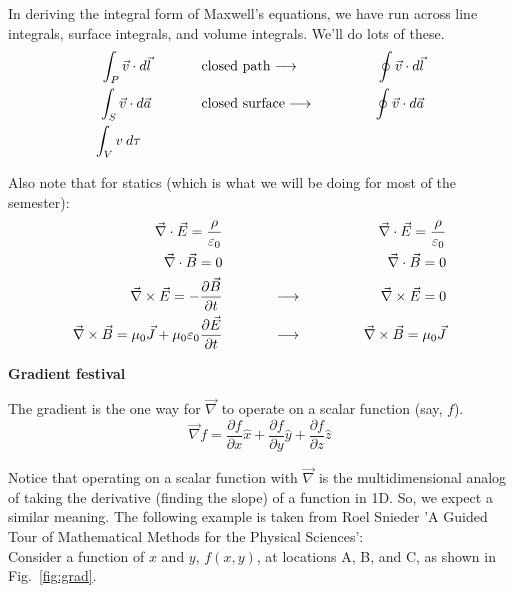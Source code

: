 \documentclass[12pt]{article}
\begin{document}
\begin{flushleft}
In deriving the integral form of Maxwell's equations, we have run across line integrals, surface integrals, and volume integrals.  We'll do lots of these.
\begin{eqnarray*}
\int_{P} \vec{v} \cdot d\vec{l}   \hspace{.5in} & \mbox{closed path} \longrightarrow  & \hspace{.5in} \oint \vec{v} \cdot d\vec{l} \\ 
\int_{S} \vec{v} \cdot d\vec{a}  \hspace{.5in} & \mbox{closed surface} \longrightarrow  & \hspace{.5in} \oint \vec{v} \cdot d\vec{a} \\
\int_{V} v \: d\tau  \hspace{.6in} & &
\end{eqnarray*}

Also note that for statics (which is what we will be doing for most of the semester):
\begin{eqnarray}
 \vec{\nabla} \cdot \vec{E}  =  \frac{\rho}{\varepsilon_{0}} \hspace{.5in} &  & \hspace{.5in} \vec{\nabla} \cdot \vec{E}  =  \frac{\rho}{\varepsilon_{0}} \nonumber \\
 \vec{\nabla} \cdot \vec{B}  =  0 \hspace{.5in} &  & \hspace{.5in}  \vec{\nabla} \cdot \vec{B}  =  0 \nonumber\\
 \vec{\nabla} \times \vec{E}  =  -\frac{\partial \vec{B}}{\partial t} \label{eq:curlE} \hspace{.5in} & \longrightarrow & \hspace{.5in} \vec{\nabla} \times \vec{E}  =  0 \nonumber \\
\vec{\nabla} \times \vec{B} = \mu_{0}\vec{J}+\mu_{0}\varepsilon_{0}\frac{\partial \vec{E}}{\partial t}  \hspace{.5in} & \longrightarrow & \hspace{.5in} \vec{\nabla} \times \vec{B} = \mu_{0}\vec{J} \nonumber
\end{eqnarray}

{\large {\bf Gradient festival} }

The gradient is the one way for $\vec{\nabla}$ to operate on a scalar function (say, $f$).
\[
\vec{\nabla}f = \frac{\partial f}{\partial x}\hat{x} +\frac{\partial f}{\partial y}\hat{y}+\frac{\partial f}{\partial z}\hat{z}
\]

Notice that operating on a scalar function with $\vec{\nabla}$ is the multidimensional analog of taking the derivative (finding the slope) of a function in 1D.  So, we expect a similar meaning.  The following example is taken from Roel Snieder 'A Guided Tour of Mathematical Methods for the Physical Sciences':\\
\vspace{.2in}
Consider a function of $x$ and $y$, $f(x,y)$, at locations A, B, and C, as shown in Fig.~\ref{fig:grad}.


\end{flushleft}
\end{document}
